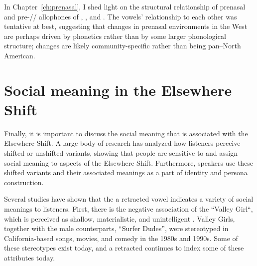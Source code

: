 In Chapter~\ref{ch:prenasal}, I shed light on the structural relationship of prenasal and pre-// allophones of \trap, \dress, and \kit. The vowels' relationship to each other was tentative at best, suggesting that changes in prenasal environments in the West are perhaps driven by phonetics rather than by some larger phonological structure; changes are likely community-specific rather than being pan--North American.





\section{Social meaning in the Elsewhere Shift}
\label{sec:social_meaning_elsewhere_shift}

Finally, it is important to discuss the social meaning that is associated with the Elsewhere Shift. A large body of research has analyzed how listeners perceive shifted or unshifted variants, showing that people are sensitive to and assign social meaning to aspects of the Elsewhere Shift. Furthermore, speakers use these shifted variants and their associated meanings as a part of identity and persona construction.

Several studies have shown that the a retracted \bat vowel indicates a variety of social meanings to listeners. First, there is the negative association of the ``Valley Girl``, which is perceived as  shallow, materialistic, and unintelligent \citep[47]{donofrio_2016_diss}. Valley Girls, together with the male counterparts, ``Surfer Dudes'', were stereotyped in California-based songs, movies, and comedy in the 1980s and 1990s. Some of these stereotypes exist today, and a retracted \bat continues to index some of these attributes today.

